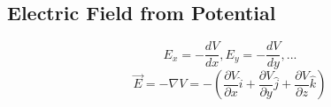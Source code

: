 \subsection{Electric Field from Potential}
$$E_x=-\frac{dV}{dx}, E_y=-\frac{dV}{dy},...$$
$$\Vec{E}=-\nabla V=-(\frac{\partial V}{\partial x}\hat{i}+\frac{\partial V}{\partial y}\hat{j}+\frac{\partial V}{\partial z}\hat{k})$$
